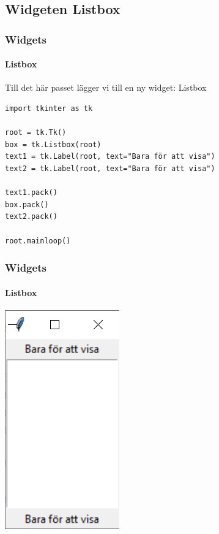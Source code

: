 \documentclass[aspectratio=169]{beamer}
\begin{document}
\subsection{Widgeten Listbox}

\begin{frame}[fragile]
	\frametitle{Widgets}
	\framesubtitle{Listbox}
	
	Till det här passet lägger vi till en ny widget: Listbox
	
	\begin{lstlisting}
import tkinter as tk

root = tk.Tk()
box = tk.Listbox(root)
text1 = tk.Label(root, text="Bara för att visa")
text2 = tk.Label(root, text="Bara för att visa")

text1.pack()
box.pack()
text2.pack()

root.mainloop()
	\end{lstlisting}
	
\end{frame}

\begin{frame}
	\frametitle{Widgets}
	\framesubtitle{Listbox}
	\centering
	\includegraphics[]{listbox-tom.png}
\end{frame}
\end{document}
